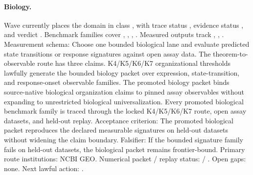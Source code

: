 \paragraph{Biology.}
Wave  currently places the domain in class , with trace status , evidence status , and verdict .
Benchmark families cover , \allowbreak {}, \allowbreak {}, \allowbreak {}.
Measured outputs track , \allowbreak {}, \allowbreak {}.
Measurement schema: Choose one bounded biological lane and evaluate predicted state transitions or response signatures against open assay data.
The theorem-to-observable route has three claims. K4/K5/K6/K7 organizational thresholds lawfully generate the bounded biology packet over expression, state-transition, and response-onset observable families. The promoted biology packet binds source-native biological organization claims to pinned assay observables without expanding to unrestricted biological universalization. Every promoted biological benchmark family is traced through the locked K4/K5/K6/K7 route, open assay datasets, and held-out replay.
Acceptance criterion: The promoted biological packet reproduces the declared measurable signatures on held-out datasets without widening the claim boundary.
Falsifier: If the bounded signature family fails on held-out datasets, the biological packet remains frontier-bound.
Primary route institutions: NCBI GEO.
Numerical packet / replay status:  / .
Open gaps: none.
Next lawful action: .

